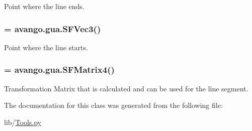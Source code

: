 \-Point where the line ends. 

\hypertarget{classlib_1_1Tools_1_1LineUpdater_a514cb8e64b3e9914708549ab7dee3696}{
\subsubsection[{sf\-\_\-start\-\_\-point}]{ = avango.\-gua.\-S\-F\-Vec3()}}\label{classlib_1_1Tools_1_1LineUpdater_a514cb8e64b3e9914708549ab7dee3696}


\-Point where the line starts. 

\hypertarget{classlib_1_1Tools_1_1LineUpdater_a6ca40aac2ab18d99273a344f3627ea86}{
\subsubsection[{sf\-\_\-transform}]{ = avango.\-gua.\-S\-F\-Matrix4()}}\label{classlib_1_1Tools_1_1LineUpdater_a6ca40aac2ab18d99273a344f3627ea86}


\-Transformation \-Matrix that is calculated and can be used for the line segment. 



\-The documentation for this class was generated from the following file\-:\begin{DoxyCompactItemize}
\item 
lib/\hyperlink{Tools_8py}{\-Tools.\-py}\end{DoxyCompactItemize}
